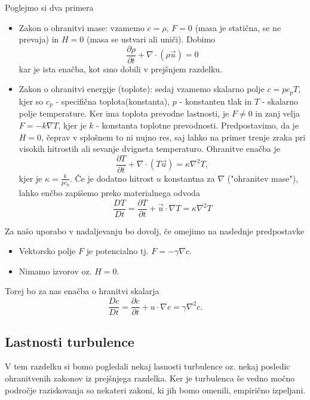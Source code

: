 \documentclass[mat2, tisk]{fmfdelo}
\begin{document}
Poglejmo si dva primera
\begin{primer}
  \hfil
\begin{itemize}
  \item Zakon o ohranitvi mase: vzamemo $c = \rho$, $F = 0$ (masa je statična, se ne prevaja) in 
  $H = 0$ (masa se ustvari ali uniči). Dobimo
  $$
  \frac{\partial \rho}{\partial t} + \nabla \cdot (\rho \vec{u}) = 0
  $$
  kar je ista enačba, kot smo dobili v prejšnjem razdelku.
  \item Zakon o ohranitvi energije (toplote): sedaj vzamemo skalarno polje $c = pc_p T$, kjer 
  so $c_p$ - specifična toplota(konstanta), $p$ - konstanten tlak in $T$ - skalarno polje temperature. 
  Ker ima toplota prevodne lastnosti, je $F \neq 0$ in zanj velja $F = -k\nabla T$, kjer je 
  $k$ - konstanta toplotne prevodnosti. Predpostavimo, da je $H = 0$, čeprav v splošnem to 
  ni nujno res, saj lahko na primer trenje zraka pri visokih hitrostih ali sevanje 
  dvigneta temperaturo. Ohranitve enačba je 
  \begin{equation}
  \frac{\partial T}{\partial t} + \nabla \cdot (T \vec{u}) = \kappa \nabla^2 T,
  \end{equation}
  kjer je $\kappa = \frac{k}{p c_p}$.
  Če je dodatno hitrost $u$ konstantna za $\nabla$ ("ohranitev mase"), lahko enčbo zapišemo preko materialnega odvoda
  \begin{equation}
  \frac{D T}{D t} = \frac{\partial T}{\partial t} + \vec{u}\cdot\nabla T = \kappa \nabla^2 T
  \end{equation}
\end{itemize}
\end{primer}
Za našo uporabo v nadaljevanju bo dovolj, če omejimo na naslednje predpostavke
\begin{itemize}
  \item Vektorsko polje $F$ je potencialno tj. $F = - \gamma \nabla c$. 
  \item Nimamo izvorov oz. $H = 0$.
\end{itemize}
Torej bo za nas enačba o hranitvi skalarja 
\begin{equation}
\frac{D c}{D t} = \frac{\partial c}{\partial t} + u\cdot\nabla c = \gamma \nabla^2 c.
\end{equation}

\subsection{Lastnosti turbulence}
V tem razdelku si bomo pogledali nekaj lasnosti turbulence oz. nekaj posledic 
ohranitvenih zakonov iz prejšnjega razdelka. Ker je turbulenca še vedno močno 
področje raziskovanja so nekateri zakoni, ki jih bomo omenili, empirično izpeljani.
\end{document}
